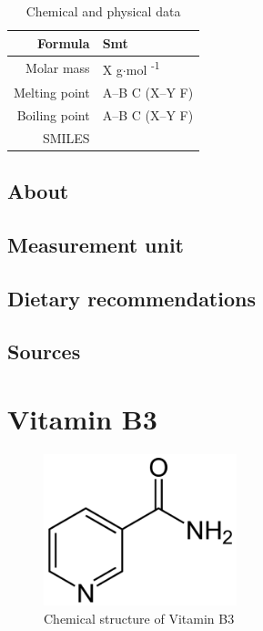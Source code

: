 \documentclass{book}
\begin{document}
\begin{table}[h]
	\caption{Chemical and physical data}
	\centering \begin{tabular}{| r | l |}
		\hline
		Formula & Smt\\ \hline
		Molar mass & X g$\cdot$mol \textsuperscript{-1}\\ \hline
		Melting point & A--B \degree C (X--Y \degree F)\\ \hline
		Boiling point & A--B \degree C (X--Y \degree F)\\ \hline
		SMILES & \\ \hline
	\end{tabular}
\end{table}
\newpage

\section{About}


\section{Measurement unit}


\section{Dietary recommendations}


\section{Sources}


\chapter{Vitamin B3}
\begin{figure}[h]
	\caption{Chemical structure of Vitamin B3}
	\centering \includegraphics[width=0.5\textwidth]{images/Vitamin_B3_chemical_structure}
\end{figure}
\end{document}
